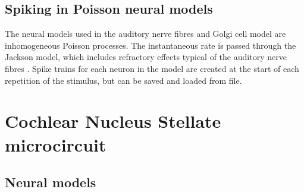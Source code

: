 \subsection{Spiking in Poisson neural models}

The neural models used in the auditory nerve fibres and Golgi cell model are
inhomogeneous Poisson processes. The instantaneous rate is passed through the
Jackson model, which includes refractory effects typical of the auditory nerve
fibres \citep{Jackson:2003,JacksonCarney:2005}.  Spike trains for each neuron in
the model are created at the start of each repetition of the stimulus, but can
be saved and loaded from file.









\section{Cochlear Nucleus Stellate microcircuit}

\subsection{Neural models}


